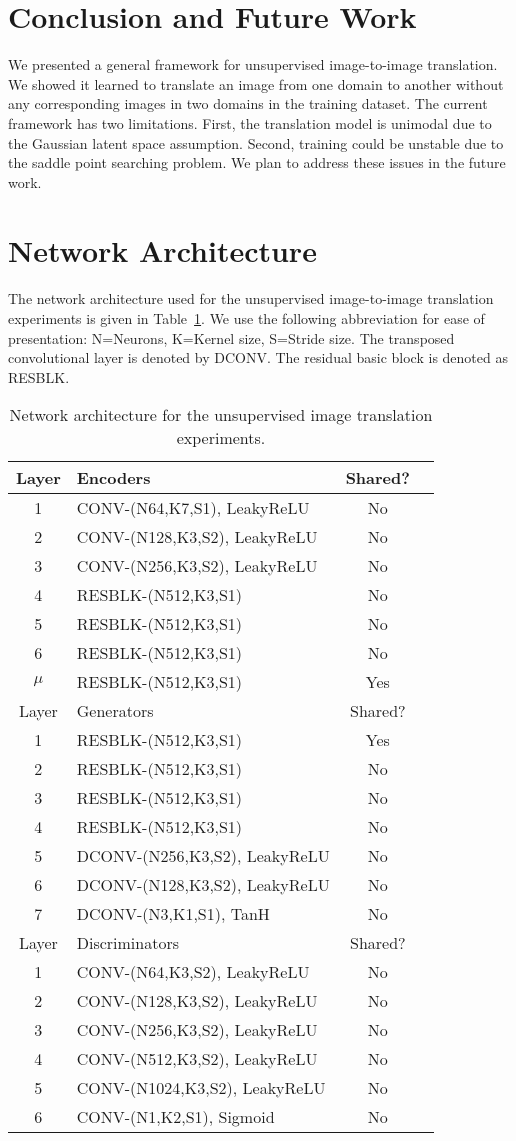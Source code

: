 \documentclass{article}
\begin{document}
\section{Conclusion and Future Work}

We presented a general framework for unsupervised image-to-image translation. We showed it learned to translate an image from one domain to another without any corresponding images in two domains in the training dataset. The current framework has two limitations. First, the translation model is unimodal due to the Gaussian latent space assumption. Second, training could be unstable due to the saddle point searching problem. We plan to address these issues in the future work. 
{\small


}
\appendix
\clearpage
\section{Network Architecture}\label{app::network}

The network architecture used for the unsupervised image-to-image translation experiments is given in Table~\ref{tbl::arch}. We use the following abbreviation for ease of presentation: N=Neurons, K=Kernel size, S=Stride size. The transposed convolutional layer is denoted by DCONV. The residual basic block is denoted as RESBLK. 

\begin{table}[tbh!]
\caption{\small Network architecture for the unsupervised image translation experiments.}
\label{tbl::arch}
\small
\centering
\begin{tabularx}{265pt}{clcc}
\toprule
Layer &  Encoders & Shared? \tabularnewline\midrule
1 & CONV-(N64,K7,S1), LeakyReLU &No\tabularnewline
2 & CONV-(N128,K3,S2), LeakyReLU  &No\tabularnewline
3 & CONV-(N256,K3,S2), LeakyReLU  &No\tabularnewline
4 & RESBLK-(N512,K3,S1) &No\tabularnewline
5 & RESBLK-(N512,K3,S1) &No\tabularnewline
6 & RESBLK-(N512,K3,S1) &No\tabularnewline
$\mu$ & RESBLK-(N512,K3,S1) &Yes\tabularnewline\midrule
Layer &  Generators & Shared?\tabularnewline\midrule
1 & RESBLK-(N512,K3,S1) &Yes\tabularnewline
2 & RESBLK-(N512,K3,S1) &No\tabularnewline
3 & RESBLK-(N512,K3,S1) &No\tabularnewline
4 & RESBLK-(N512,K3,S1) &No\tabularnewline
5 &  DCONV-(N256,K3,S2), LeakyReLU &No\tabularnewline
6 &  DCONV-(N128,K3,S2), LeakyReLU &No\tabularnewline
7 &  DCONV-(N3,K1,S1), TanH & No\tabularnewline\midrule
Layer &  Discriminators & Shared? \tabularnewline\midrule
1 & CONV-(N64,K3,S2), LeakyReLU &No\tabularnewline
2 & CONV-(N128,K3,S2), LeakyReLU  &No\tabularnewline
3 & CONV-(N256,K3,S2), LeakyReLU  &No\tabularnewline
4 & CONV-(N512,K3,S2), LeakyReLU  &No\tabularnewline
5 & CONV-(N1024,K3,S2), LeakyReLU  &No\tabularnewline
6 & CONV-(N1,K2,S1), Sigmoid &No\tabularnewline\bottomrule
\end{tabularx}
\end{table}
\end{document}
